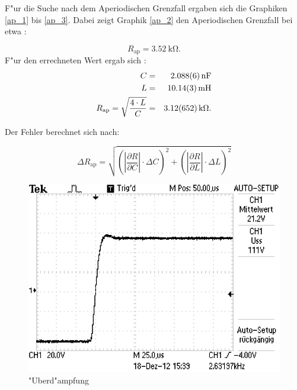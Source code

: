 	

	F"ur die Suche nach dem Aperiodischen Grenzfall ergaben sich die Graphiken \eqref{ap_1} bis \eqref{ap_3}.
	Dabei zeigt Graphik \eqref{ap_2} den Aperiodischen Grenzfall bei etwa :

	\begin{equation*}
		R_\mathrm{ap} = \SI{3.52}{\kilo\ohm}.
	\end{equation*}
		F"ur den errechneten Wert ergab sich :
	\begin{eqnarray*}
		C &=& \SI{2.088 (6)}{\nano \farad}\\
		L &=& \SI{10.14 (3)}{\milli \henry}\\
		R_\mathrm{ap} = \sqrt{\frac{4 \cdot L}{C}} &=& \SI{3.12 (652)}{\kilo\ohm}.
	\end{eqnarray*}

	Der Fehler berechnet sich nach:

	\begin{equation}
		\Delta R_\mathrm{ap} = \sqrt{ \left( |\frac{\partial R}{\partial C}| \cdot \Delta C \right)^2 + \left( |\frac{\partial R}{\partial L}| \cdot \Delta L \right)^2}
	\end{equation}

	\begin{figure}[htbp]
			\centering
			\includegraphics[width = 12cm]{img/F0003TEK.jpg}
			\caption{"Uberd"ampfung}
			\label{ap_1}
		\end{figure}	

